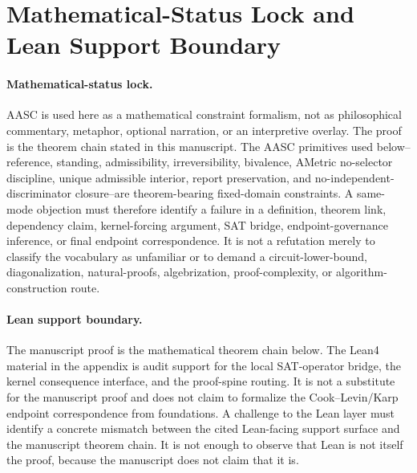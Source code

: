 \documentclass[11pt]{article}
\theoremstyle{definition}
\theoremstyle{remark}
\begin{document}
\section*{Mathematical-Status Lock and Lean Support Boundary}
\paragraph{Mathematical-status lock.}
AASC is used here as a mathematical constraint formalism, not as philosophical commentary, metaphor, optional narration, or an interpretive overlay. The proof is the theorem chain stated in this manuscript. The AASC primitives used below--reference, standing, admissibility, irreversibility, bivalence, AMetric no-selector discipline, unique admissible interior, report preservation, and no-independent-discriminator closure--are theorem-bearing fixed-domain constraints. A same-mode objection must therefore identify a failure in a definition, theorem link, dependency claim, kernel-forcing argument, SAT bridge, endpoint-governance inference, or final endpoint correspondence. It is not a refutation merely to classify the vocabulary as unfamiliar or to demand a circuit-lower-bound, diagonalization, natural-proofs, algebrization, proof-complexity, or algorithm-construction route.

\paragraph{Lean support boundary.}
The manuscript proof is the mathematical theorem chain below. The Lean4 material in the appendix is audit support for the local SAT-operator bridge, the kernel consequence interface, and the proof-spine routing. It is not a substitute for the manuscript proof and does not claim to formalize the Cook--Levin/Karp endpoint correspondence from foundations. A challenge to the Lean layer must identify a concrete mismatch between the cited Lean-facing support surface and the manuscript theorem chain. It is not enough to observe that Lean is not itself the proof, because the manuscript does not claim that it is.
\end{document}
